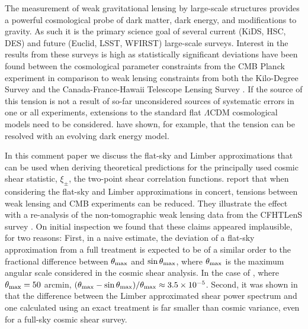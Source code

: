 \documentclass[fleqn, usenatbib]{mnras}
\begin{document}
The measurement of weak gravitational lensing by large-scale structures provides a powerful cosmological probe of dark matter, dark energy, and modifications to gravity.  As such it is the primary science goal of several current (KiDS, HSC, DES) and future (Euclid, LSST, WFIRST) large-scale surveys. Interest in the results from these surveys is high as statistically significant deviations have been found between the cosmological parameter constraints from the CMB Planck experiment \citep{planck/cosmo:2015} in comparison to weak lensing constraints from both the Kilo-Degree Survey \citep[KiDS;][]{hildebrandt/etal:2016} and the Canada-France-Hawaii Telescope Lensing Survey \citep[CFHTLenS;][] {joudaki/etal:2016}.  If the source of this tension is not a result of so-far unconsidered sources of systematic errors in one or all experiments, extensions to the standard flat $\Lambda$CDM cosmological models need to be considered.  \citet{joudaki/etal:2017} have shown, for example, that the tension can be resolved with an evolving dark energy model.

In this comment paper we discuss the flat-sky and Limber approximations that can be used when deriving theoretical predictions for the principally used cosmic shear statistic, $\xi_\pm$, the two-point shear correlation functions.  \citet{kitching/etal:2016} report that when considering the flat-sky and Limber approximations in concert, tensions between weak lensing and CMB experiments can be reduced. They illustrate the effect with a re-analysis of the non-tomographic weak lensing data from the CFHTLenS survey \citep{kilbinger/etal:2013}.    On initial inspection we found that these claims appeared implausible, for two reasons: First, in a naive estimate, the deviation of a flat-sky approximation from a full treatment is expected to be of a similar order to the fractional difference between $\theta_{\rm max}$ and $\sin\theta_{\rm max}$,
where $\theta_{\rm max}$ is the maximum angular scale considered in the cosmic shear analysis. In the case of \citet{hildebrandt/etal:2016}, where $\theta_{\rm max}=50$ arcmin, $(\theta_{\rm max} - \sin\theta_{\rm max})/\theta_{\rm max} \approx 3.5 \times 10^{-5}$.  Second, it was shown in \citet[][see their Fig.3]{giannantonio/etal:2012} that the difference between the Limber approximated shear power spectrum and one calculated using an exact treatment is far smaller than cosmic variance, even for a full-sky cosmic shear survey.
\end{document}
